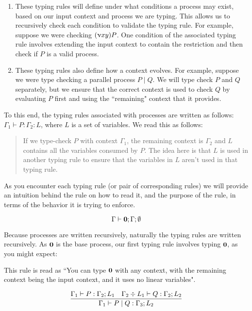 \begin{enumerate}

\item These typing rules will define under what conditions a process may exist, based on our input context and process we are typing. This allows us to recursively check each condition to validate the typing rule. For example, suppose we were checking $(\upnu xy) P$. One condition of the associated typing rule involves extending the input context to contain the restriction and then check if $P$ is a valid process.  
\item These typing rules also define how a context evolves. For example, suppose we were type checking a parallel process $P \mid Q$. We will type check $P$ and $Q$ separately, but we ensure that the correct context is used to check $Q$ by evaluating $P$ first and using the ``remaining" context that it provides.
\end{enumerate}

To this end, the typing rules associated with processes are written as follows: $\Gamma_1 \vdash P : \Gamma_2 : L$, where $L$ is a set of variables. We read this as follows:
\begin{quote}
    If we type-check $P$ with context $\Gamma_1$, the remaining context is $\Gamma_2$ and $L$ contains all the variables consumed by $P$. The idea here is that $L$ is used in another typing rule to ensure that the variables in $L$ aren't used in that typing rule.
\end{quote}


As you encounter each typing rule (or pair of corresponding rules) we will provide an intuition behind the rule on how to read it, and the purpose of the rule, in terms of the behavior it is trying to enforce.

$$
\Gamma \vdash \textbf{0} ; \Gamma ; \emptyset
$$

Because processes are written recursively, naturally the typing rules are written recursively. As $\textbf{0}$ is the base process, our first typing rule involves typing $\textbf{0}$, as you might expect:

This rule is read as ``You can type $\textbf{0}$ with any context, with the remaining context being the input context, and it uses no linear variables".

$$
\frac{\Gamma_1 \vdash P : \Gamma_2 ; L_1 \quad \Gamma_2 \div L_1 \vdash Q : \Gamma_2 ; L_2}{\Gamma_1 \vdash P \mid Q : \Gamma_3 ; L_2}
$$


